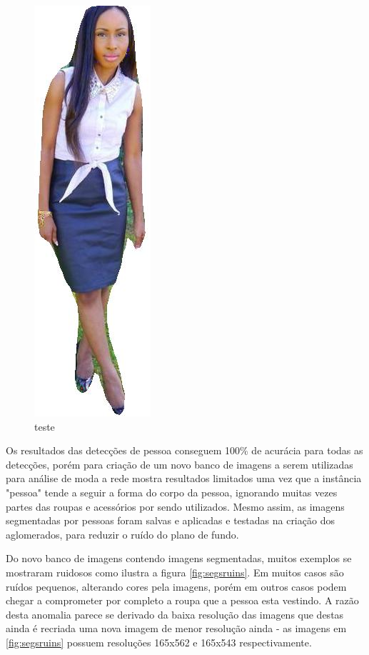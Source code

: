 \documentclass[12pt]{report}
\begin{document}
\begin{figure}
\begin{minipage}[b]{0.3\textwidth}
    \includegraphics[scale=0.5]{images/resultados/1082993mask.jpg}
    \caption{}
  \end{minipage}
    \hfill
  \caption{teste}
  \label{fig:person-seg}
\end{figure}

Os resultados das detecções de pessoa conseguem 100\% de acurácia para todas as detecções, porém para criação de um novo banco de imagens a serem utilizadas para análise de moda a rede mostra resultados limitados uma vez que a instância "pessoa" tende a seguir a forma do corpo da pessoa, ignorando muitas vezes partes das roupas e acessórios por sendo utilizados. Mesmo assim, as imagens segmentadas por pessoas foram salvas e aplicadas e testadas na criação dos aglomerados, para reduzir o ruído do plano de fundo. 

Do novo banco de imagens contendo imagens segmentadas, muitos exemplos se mostraram ruidosos como ilustra a figura \ref{fig:segsruins}. Em muitos casos são ruídos pequenos, alterando cores pela imagens, porém em outros casos podem chegar a comprometer por completo a roupa que a pessoa esta vestindo. A razão desta anomalia parece se derivado da baixa resolução das imagens que destas ainda é recriada uma nova imagem de menor resolução ainda - as imagens em \ref{fig:segsruins} possuem resoluções 165x562 e 165x543 respectivamente.
\end{document}

